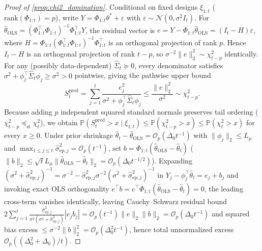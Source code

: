 \documentclass[11pt,a4paper,reqno]{amsart}
\theoremstyle{definition}
\theoremstyle{remark}
\newcommand{\Prob}{\mathbb{P}}
\newcommand{\Ncal}{\mathcal{N}}
\begin{document}
\begin{proof}[Proof of \cref{prop:chi2_domination}]
Conditional on fixed designs $\xi_{1:t}$ ($\mathrm{rank}(\Phi_{1:t}) = p$), write $Y = \Phi_{1:t} \theta^* + \varepsilon$ with $\varepsilon \sim \Ncal(0, \sigma^2 I_t)$. For $\hat{\theta}_{\mathrm{OLS}} = (\Phi_{1:t}^\top\Phi_{1:t})^{-1}\Phi_{1:t}^\top Y$, the residual vector is $e = Y - \Phi_{1:t}\hat{\theta}_{\mathrm{OLS}} = (I_t - H)\varepsilon$, where $H = \Phi_{1:t}(\Phi_{1:t}^\top\Phi_{1:t})^{-1}\Phi_{1:t}^\top$ is an orthogonal projection of rank $p$. Hence $I_t - H$ is an orthogonal projection of rank $t - p$, so $\sigma^{-2}\|e\|_2^2 \sim \chi^2_{t-p}$ identically. For any (possibly data-dependent) $\hat{\Sigma}_t \succeq 0$, every denominator satisfies $\sigma^2 + \phi_j^\top\hat{\Sigma}_t\phi_j \ge \sigma^2 > 0$ pointwise, giving the pathwise upper bound
\[
S_t^{\mathrm{pred}} = \sum_{j=1}^t \frac{e_j^2}{\sigma^2 + \phi_j^\top\hat{\Sigma}_t\phi_j} \le \frac{\|e\|_2^2}{\sigma^2} \sim \chi^2_{t-p}.
\]
Because adding $p$ independent squared standard normals preserves tail ordering ($\chi^2_{t-p} \preceq_{\mathrm{st}} \chi^2_t$), we obtain $\Prob(S_t^{\mathrm{pred}} > x \mid \xi_{1:t}) \le \Prob(\chi^2_{t-p} > x) \le \Prob(\chi^2_t > x)$ for every $x \ge 0$. Under prior shrinkage $\hat{\theta}_t - \hat{\theta}_{\mathrm{OLS}} = \mathcal{O}_p(\Delta_0 t^{-1})$ with $\|\phi_j\|_2 \le L_\mu$ and $\max_{1\le j\le t}\hat{\sigma}_{\mathrm{ep},j}^2 = \mathcal{O}_p(t^{-1})$, set $b = \Phi_{1:t}(\hat{\theta}_{\mathrm{OLS}} - \hat{\theta}_t)$ ($\|b\|_2 \le \sqrt{t} L_\mu \|\hat{\theta}_{\mathrm{OLS}} - \hat{\theta}_t\|_2 = \mathcal{O}_p(\Delta_0 t^{-1/2})$). Expanding $(\sigma^2 + \hat{\sigma}_{\mathrm{ep},j}^2)^{-1} = \sigma^{-2} - \hat{\sigma}_{\mathrm{ep},j}^2 \sigma^{-2}(\sigma^2 + \hat{\sigma}_{\mathrm{ep},j}^2)^{-1}$ in $Y_j - \phi_j^\top\hat{\theta}_t = e_j + b_j$ and invoking exact OLS orthogonality $e^\top b = e^\top\Phi_{1:t}(\hat{\theta}_{\mathrm{OLS}} - \hat{\theta}_t) = 0$, the leading cross-term vanishes identically, leaving Cauchy--Schwarz residual bound $2\sum_{j=1}^t \frac{\hat{\sigma}_{\mathrm{ep},j}^2}{\sigma^2(\sigma^2+\hat{\sigma}_{\mathrm{ep},j}^2)} |e_j b_j| = \mathcal{O}_p(t^{-1})\|e\|_2\|b\|_2 = \mathcal{O}_p(\Delta_0 t^{-1})$ and squared bias excess $\le \sigma^{-2}\|b\|_2^2 = \mathcal{O}_p(\Delta_0^2 t^{-1})$, hence total unnormalized excess $\mathcal{O}_p((\Delta_0^2 + \Delta_0)/t)$.
\end{proof}
\end{document}
